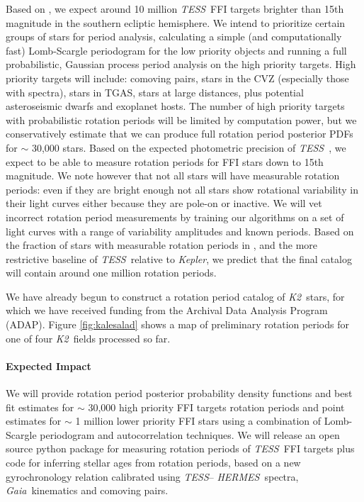 \documentclass[letterpaper,12pt,preprint]{hack_aastex}
\newcommand{\Kepler}{{\it Kepler}}
\newcommand{\kepler}{\Kepler}
\newcommand{\Ktwo}{{\it K2}}
\newcommand{\ktwo}{\Ktwo}
\newcommand{\TESS}{{\it TESS}}
\newcommand{\tess}{{\it TESS}}
\newcommand{\Gaia}{{\it Gaia}}
\newcommand{\HERMES}{{\it HERMES}}
\begin{document}
Based on \citet{sullivan2015}, we expect around 10 million \TESS\ FFI
targets brighter than 15th magnitude in the southern ecliptic hemisphere.
We intend to prioritize certain groups of stars for period analysis,
calculating a simple (and computationally fast) Lomb-Scargle periodogram for
the low priority objects and running a full probabilistic, Gaussian process
period analysis on the high priority targets.
High priority targets will include: comoving pairs, stars in the CVZ
(especially those with spectra), stars in TGAS, stars at large distances, plus
potential asteroseismic dwarfs and exoplanet hosts.
The number of high priority targets with probabilistic rotation periods will
be limited by computation power, but we conservatively estimate that we can
produce full rotation period posterior PDFs for $\sim$ 30,000 stars.
Based on the expected photometric precision of \tess\ \citep{sullivan2015}, we
expect to be able to measure rotation periods for FFI stars down to 15th
magnitude.
We note however that not all stars will have measurable rotation periods:
even if they are bright enough not all stars show rotational variability in
their light curves either because they are pole-on or inactive.
We will vet incorrect rotation period measurements by training our algorithms
on a set of light curves with a range of variability amplitudes and known
periods.
Based on the fraction of stars with measurable rotation periods in
\citet{mcquillan2014}, and the more restrictive baseline of \tess\ relative to
\kepler, we predict that the final catalog will contain around one million
rotation periods.

We have already begun to construct a rotation period catalog of \ktwo\ stars,
for which we have received funding from the Archival Data Analysis Program
(ADAP).
Figure \ref{fig:kalesalad} shows a map of preliminary rotation periods for one
of four \ktwo\ fields processed so far.


\paragraph{Expected Impact}
We will provide rotation period posterior probability density functions and
best fit estimates for $\sim$ 30,000 high priority FFI targets rotation
periods and point estimates for $\sim$ 1 million lower priority FFI stars
using a combination of Lomb-Scargle periodogram and autocorrelation
techniques.
We will release an open source python package for measuring rotation periods
of \tess\ FFI targets plus code for inferring stellar ages from rotation
periods, based on a new gyrochronology relation calibrated using \TESS--
\HERMES\ spectra, \Gaia\ kinematics and comoving pairs.
\end{document}
